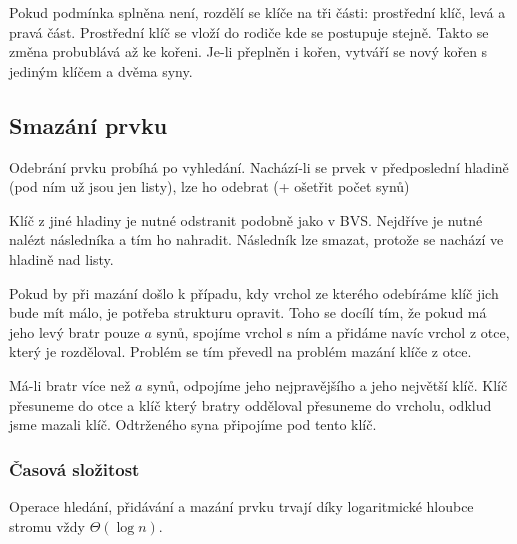 Pokud podmínka splněna není, rozdělí se klíče na tři části: prostřední klíč, levá a pravá část.
Prostřední klíč se vloží do rodiče kde se postupuje stejně.
Takto se změna probublává až ke kořeni.
Je-li přeplněn i kořen, vytváří se nový kořen s jediným klíčem a dvěma syny.


\subsection{Smazání prvku}

Odebrání prvku probíhá po vyhledání.
Nachází-li se prvek v předposlední hladině (pod ním už jsou jen listy), lze ho odebrat (+ ošetřit počet synů)

Klíč z jiné hladiny je nutné odstranit podobně jako v BVS.
Nejdříve je nutné nalézt následníka a tím ho nahradit.
Následník lze smazat, protože se nachází ve hladině nad listy.

Pokud by při mazání došlo k případu, kdy vrchol ze kterého odebíráme klíč jich bude mít málo, je potřeba strukturu opravit.
Toho se docílí tím, že pokud má jeho levý bratr pouze $a$ synů, spojíme vrchol s ním a přidáme navíc vrchol z otce, který je rozděloval.
Problém se tím převedl na problém mazání klíče z otce.

Má-li bratr více než $a$ synů, odpojíme jeho nejpravějšího a jeho největší klíč.
Klíč přesuneme do otce a klíč který bratry odděloval přesuneme do vrcholu, odklud jsme mazali klíč.
Odtrženého syna připojíme pod tento klíč.

\subsubsection{Časová složitost}

Operace hledání, přidávání a mazání prvku trvají díky logaritmické hloubce stromu vždy $\Theta(\log n)$.
